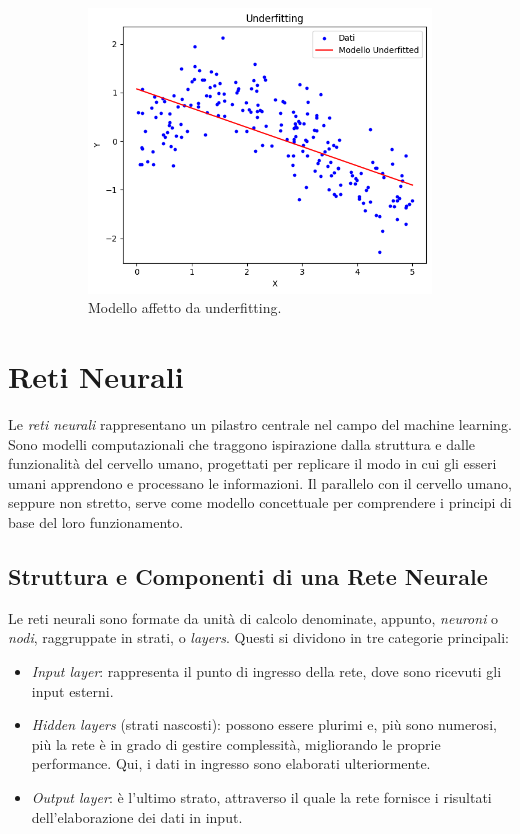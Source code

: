 \documentclass[12pt,a4paper,twoside,openright]{book}
\begin{document}
\begin{figure}[H]
\quad
    \begin{subfigure}[b]{0.3\textwidth}
    \includegraphics[width=\textwidth]{images/underfitting.png}
    \caption{Modello affetto da underfitting.}
    \end{subfigure}
\caption{}
\label{fig:over_under_fitting}
\end{figure}


\section{Reti Neurali}
Le \emph{reti neurali} rappresentano un pilastro centrale nel campo del machine learning. Sono modelli computazionali che traggono ispirazione dalla struttura e dalle funzionalità del cervello umano, progettati per replicare il modo in cui gli esseri umani apprendono e processano le informazioni. Il parallelo con il cervello umano, seppure non stretto, serve come modello concettuale per comprendere i principi di base del loro funzionamento.

\subsection{Struttura e Componenti di una Rete Neurale}
Le reti neurali sono formate da unità di calcolo denominate, appunto, \emph{neuroni} o \emph{nodi}, raggruppate in strati, o \emph{layers}. Questi si dividono in tre categorie principali:
\begin{itemize}
    \item \emph{Input layer}: rappresenta il punto di ingresso della rete, dove sono ricevuti gli input esterni.
    \item \emph{Hidden layers} (strati nascosti): possono essere plurimi e, più sono numerosi, più la rete è in grado di gestire complessità, migliorando le proprie performance. Qui, i dati in ingresso sono elaborati ulteriormente.
    \item \emph{Output layer}: è l'ultimo strato, attraverso il quale la rete fornisce i risultati dell'elaborazione dei dati in input.
\end{itemize}
\end{document}
